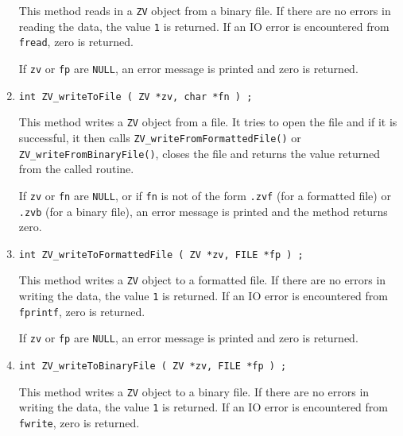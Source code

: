 \begin{enumerate}
\par
This method reads in a {\tt ZV} object from a binary file.
If there are no errors in reading the data, 
the value {\tt 1} is returned.
If an IO error is encountered from {\tt fread}, zero is returned.
\par {}
If {\tt zv} or {\tt fp} are {\tt NULL},
an error message is printed and zero is returned.
\item
\begin{verbatim}
int ZV_writeToFile ( ZV *zv, char *fn ) ;
\end{verbatim}
\par
This method writes a {\tt ZV} object from a file.
It tries to open the file and if it is successful, 
it then calls {\tt ZV\_writeFromFormattedFile()} or
{\tt ZV\_writeFromBinaryFile()},
closes the file
and returns the value returned from the called routine.
\par {}
If {\tt zv} or {\tt fn} are {\tt NULL}, 
or if {\tt fn} is not of the form
{\tt *.zvf} (for a formatted file) 
or {\tt *.zvb} (for a binary file),
an error message is printed and the method returns zero.
\item
\begin{verbatim}
int ZV_writeToFormattedFile ( ZV *zv, FILE *fp ) ;
\end{verbatim}
\par
This method writes a {\tt ZV} object to a formatted file.
If there are no errors in writing the data, 
the value {\tt 1} is returned.
If an IO error is encountered from {\tt fprintf}, zero is returned.
\par {}
If {\tt zv} or {\tt fp} are {\tt NULL},
an error message is printed and zero is returned.
\item
\begin{verbatim}
int ZV_writeToBinaryFile ( ZV *zv, FILE *fp ) ;
\end{verbatim}
\par
This method writes a {\tt ZV} object to a binary file.
If there are no errors in writing the data, 
the value {\tt 1} is returned.
If an IO error is encountered from {\tt fwrite}, zero is returned.

\end{enumerate}
